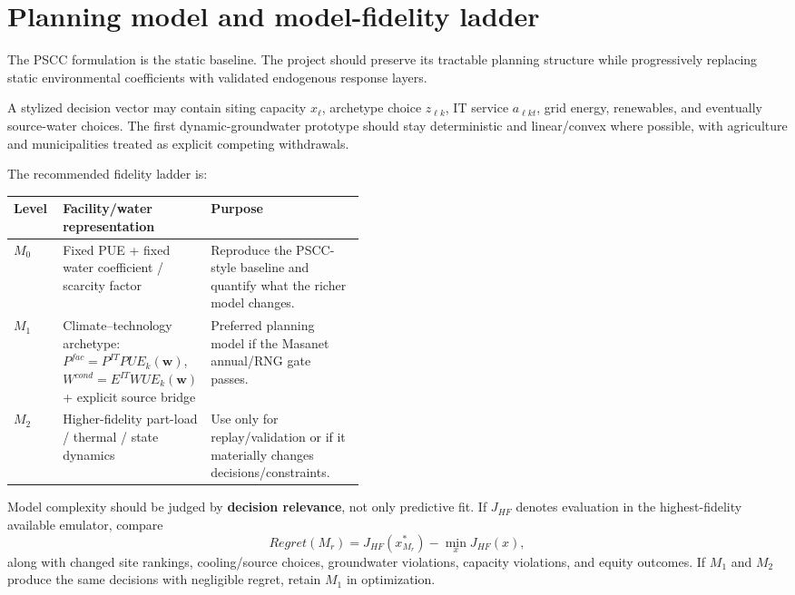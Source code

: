 \documentclass[11pt]{article}
\begin{document}
\section{Planning model and model-fidelity ladder}

The PSCC formulation is the static baseline. The project should preserve its tractable planning structure while progressively replacing static environmental coefficients with validated endogenous response layers.

A stylized decision vector may contain siting capacity $x_\ell$, archetype choice $z_{\ell k}$, IT service $a_{\ell kt}$, grid energy, renewables, and eventually source-water choices. The first dynamic-groundwater prototype should stay deterministic and linear/convex where possible, with agriculture and municipalities treated as explicit competing withdrawals.

The recommended fidelity ladder is:

\begin{center}
\small
\begin{tabularx}{0.96\linewidth}{@{}p{0.14\linewidth}p{0.31\linewidth}Y@{}}
\toprule
\textbf{Level} & \textbf{Facility/water representation} & \textbf{Purpose} \\
\midrule
$M_0$ & Fixed PUE + fixed water coefficient / scarcity factor & Reproduce the PSCC-style baseline and quantify what the richer model changes. \\
$M_1$ & Climate--technology archetype: $P^{fac}=P^{IT}PUE_k(\mathbf w)$, $W^{cond}=E^{IT}WUE_k(\mathbf w)$ + explicit source bridge & Preferred planning model if the Masanet annual/RNG gate passes. \\
$M_2$ & Higher-fidelity part-load / thermal / state dynamics & Use only for replay/validation or if it materially changes decisions/constraints. \\
\bottomrule
\end{tabularx}
\end{center}

Model complexity should be judged by \textbf{decision relevance}, not only predictive fit. If $J_{HF}$ denotes evaluation in the highest-fidelity available emulator, compare
\[
Regret(M_r)=J_{HF}(x^*_{M_r})-\min_xJ_{HF}(x),
\]
along with changed site rankings, cooling/source choices, groundwater violations, capacity violations, and equity outcomes. If $M_1$ and $M_2$ produce the same decisions with negligible regret, retain $M_1$ in optimization.
\end{document}

